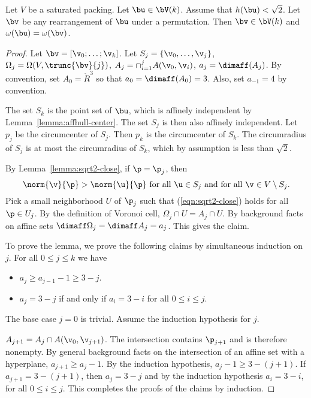 \begin{lemma}   \label{lemma:perm-Vk}
  Let $V$ be a saturated packing.  Let $\bu\in \bV(k)$.  Assume that
  $h(\bu)<\sqrt2$. Let $\bv$ be any rearrangement of $\bu$ under a
  permutation.  Then $\bv\in \bV(k)$ and $\omega(\bu) = \omega(\bv)$.
\end{lemma}

\begin{proof} 
Let $\bv = [\v_0;\ldots;\v_k]$.  Let $S_j = \{\v_0,\ldots,\v_j\}$,  $\Omega_j = \Omega(V,\trunc{\bv}{j})$, $A_j=\cap_{i=1}^j A(\v_0,\v_i)$, $a_j = \dimaff(A_j)$.
By convention, set $A_0 = \ring{R}^3$ so that $a_0=\dimaff(A_0) = 3$.
Also, set $a_{-1} = 4$ by convention.

The set $S_k$ is the point set of $\bu$,
which is affinely independent by Lemma~\ref{lemma:affhull-center}.  The set $S_j$ is then also affinely independent.  Let $p_j$ be the circumcenter of $S_j$.  Then $p_k$ is the
circumcenter of $S_k$.  The circumradius of $S_j$ is at most the circumradius of $S_k$,
which by assumption is less than $\sqrt2$.

By Lemma~\ref{lemma:sqrt2-close}, if $\p=\p_j$, then
\begin{equation}\label{eqn:sqrt2-close}
\norm{\v}{\p} > \norm{\u}{\p}\text{ for all }\u\in S_j
\text{ and for all }\v\in V\setminus S_j.
\end{equation}   
Pick a small neighborhood $U$ of $\p_j$ such that (\ref{eqn:sqrt2-close}) holds
for all $\p\in U_j$.  By the definition of Voronoi cell, $\Omega_j \cap U=A_j\cap U$.
By background facts on affine sets $\dimaff\Omega_j = \dimaff A_j=a_j$.  This gives
the claim.

To prove the lemma, we prove the following claims by simultaneous induction on $j$.
For all $0\le j\le k$ we have
\begin{itemize}
\item $a_j \ge a_{j-1} - 1\ge 3-j$.
\item $a_j = 3-j$ if and only if $a_i=3-i$ for all $0\le i\le j$.
\end{itemize}
The base case $j=0$ is trivial.  Assume the induction hypothesis for $j$.

$A_{j+1} = A_{j}\cap A(\v_0,\v_{j+1})$.  The intersection contains $\p_{j+1}$ and is therefore
nonempty.  By general background facts on the intersection of an
affine set with a hyperplane, $a_{j+1} \ge a_{j}-1$.  By the induction hypothesis,
$a_{j}-1\ge 3-(j+1)$.
If $a_{j+1}=3-(j+1)$, then $a_{j}=3-j$ and by the induction hypothesis
$a_{i}=3-i$, for all $0\le i\le j$. This completes the proofs of the claims by induction.


\end{proof}
